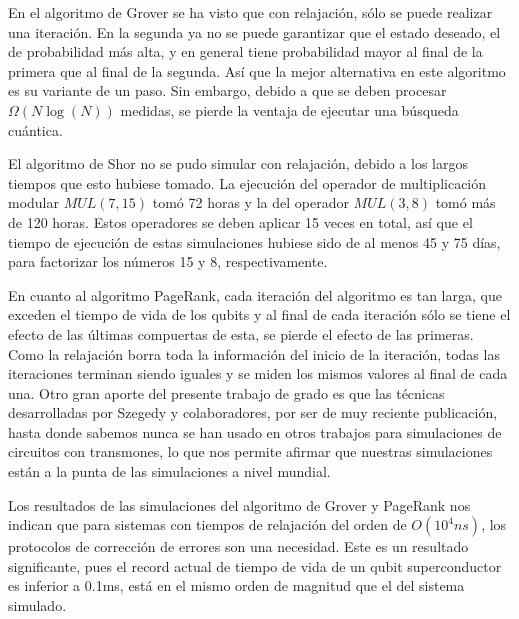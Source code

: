 En el algoritmo de Grover se ha visto que con relajación, sólo se puede realizar una iteración. En la segunda ya no se puede garantizar que el estado deseado, el de probabilidad más alta, y en general tiene probabilidad mayor al final de la primera que al final de la segunda. Así que la mejor alternativa en este algoritmo es su variante de un paso. Sin embargo, debido a que se deben procesar $\Omega(N \log(N))$ medidas, se pierde la ventaja de ejecutar una búsqueda cuántica.

El algoritmo de Shor no se pudo simular con relajación, debido a los largos tiempos que esto hubiese tomado. La ejecución del operador de multiplicación modular $MUL(7,15)$ tomó 72 horas y la del operador $MUL(3,8)$ tomó más de 120 horas. Estos operadores se deben aplicar 15 veces en total, así que el tiempo de ejecución de estas simulaciones hubiese sido de al menos 45 y 75 días, para factorizar los números 15 y 8, respectivamente.

En cuanto al algoritmo PageRank, cada iteración del algoritmo es tan larga, que exceden el tiempo de vida de los qubits y al final de cada iteración sólo se tiene el efecto de las últimas compuertas de esta, se pierde el efecto de las primeras. Como la relajación borra toda la información del inicio de la iteración, todas las iteraciones terminan siendo iguales y se miden los mismos valores al final de cada una. Otro gran aporte del presente trabajo de grado es que las técnicas desarrolladas por Szegedy y colaboradores, por ser de muy reciente publicación, hasta donde sabemos nunca se han usado en otros trabajos  para simulaciones de circuitos con transmones, lo que nos permite afirmar que nuestras simulaciones están a la punta de las simulaciones a nivel mundial. 


Los resultados de las simulaciones del algoritmo de Grover y PageRank nos indican que para sistemas con tiempos de relajación del orden de $O(10^4 ns)$, los protocolos de corrección de errores son una necesidad. Este es un resultado significante, pues el record actual de tiempo de vida de un qubit superconductor es inferior a 0.1ms, está en el mismo orden de magnitud que el del sistema simulado.

